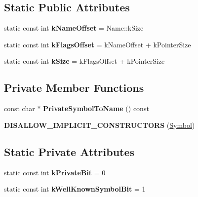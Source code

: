\subsection*{Static Public Attributes}
\begin{DoxyCompactItemize}
\item 
static const int {\bfseries k\+Name\+Offset} = Name\+::k\+Size\hypertarget{classv8_1_1internal_1_1_symbol_a14fbd11fa0abcb101ac466bce1c9c283}{}\label{classv8_1_1internal_1_1_symbol_a14fbd11fa0abcb101ac466bce1c9c283}

\item 
static const int {\bfseries k\+Flags\+Offset} = k\+Name\+Offset + k\+Pointer\+Size\hypertarget{classv8_1_1internal_1_1_symbol_a7518f1a85c7bc3754cf5625e7f750d2f}{}\label{classv8_1_1internal_1_1_symbol_a7518f1a85c7bc3754cf5625e7f750d2f}

\item 
static const int {\bfseries k\+Size} = k\+Flags\+Offset + k\+Pointer\+Size\hypertarget{classv8_1_1internal_1_1_symbol_abb1c7a199d15453abd999c4542054e83}{}\label{classv8_1_1internal_1_1_symbol_abb1c7a199d15453abd999c4542054e83}

\end{DoxyCompactItemize}
\subsection*{Private Member Functions}
\begin{DoxyCompactItemize}
\item 
const char $\ast$ {\bfseries Private\+Symbol\+To\+Name} () const \hypertarget{classv8_1_1internal_1_1_symbol_ac7993c615b077e521a282d9dee25ba52}{}\label{classv8_1_1internal_1_1_symbol_ac7993c615b077e521a282d9dee25ba52}

\item 
{\bfseries D\+I\+S\+A\+L\+L\+O\+W\+\_\+\+I\+M\+P\+L\+I\+C\+I\+T\+\_\+\+C\+O\+N\+S\+T\+R\+U\+C\+T\+O\+RS} (\hyperlink{classv8_1_1internal_1_1_symbol}{Symbol})\hypertarget{classv8_1_1internal_1_1_symbol_ab92f1cce6ea21e77c4604ea02a297fe5}{}\label{classv8_1_1internal_1_1_symbol_ab92f1cce6ea21e77c4604ea02a297fe5}

\end{DoxyCompactItemize}
\subsection*{Static Private Attributes}
\begin{DoxyCompactItemize}
\item 
static const int {\bfseries k\+Private\+Bit} = 0\hypertarget{classv8_1_1internal_1_1_symbol_a4e242c56c5db05059b55bb31cf32afe8}{}\label{classv8_1_1internal_1_1_symbol_a4e242c56c5db05059b55bb31cf32afe8}

\item 
static const int {\bfseries k\+Well\+Known\+Symbol\+Bit} = 1\hypertarget{classv8_1_1internal_1_1_symbol_a530f2fa5c93f99bbe4c5aa9538030e54}{}\label{classv8_1_1internal_1_1_symbol_a530f2fa5c93f99bbe4c5aa9538030e54}

\end{DoxyCompactItemize}
